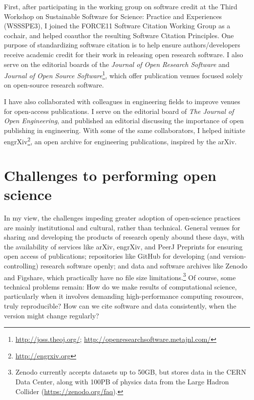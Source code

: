 \documentclass[nobib]{tufte-handout}
\begin{document}
First, after participating in the working group on software credit at the Third
Workshop on Sustainable Software for Science: Practice and Experiences
(WSSSPE3)\autocite{Katz:2016er}, I joined the FORCE11 Software Citation Working
Group as a cochair, and helped coauthor the resulting Software Citation
Principles\autocite{Smith:2016kt}. One purpose of standardizing software
citation is to help ensure authors\slash developers receive academic credit for
their work in releasing open research software. I also serve on the editorial
boards of the \textit{Journal of Open Research
Software} and \textit{Journal of Open Source Software}\footnote{\url{http://joss.theoj.org/};
\url{http://openresearchsoftware.metajnl.com/}},
which offer publication venues focused solely on open-source research software.

I have also collaborated with colleagues in engineering fields to improve
venues for open-access publications. I serve on the editorial board of
\textit{The Journal of Open Engineering},
and published an editorial discussing the importance of open publishing in
engineering\autocite{TJOE:editorial}. With some of the same collaborators, I
helped initiate engrXiv\footnote{\url{http://engrxiv.org}}, an open archive
for engineering publications, inspired by the arXiv.


\section{Challenges to performing open science}
\label{sec:challenges}

In my view, the challenges impeding greater adoption of open-science practices
are mainly institutional and cultural, rather than technical. General venues for sharing
and developing the products of research openly abound these days, with the availability
of services like arXiv, engrXiv, and PeerJ Preprints for ensuring open access of
publications; repositories like GitHub for developing (and version-controlling)
research software openly; and data and software archives like Zenodo and Figshare,
which practically have no file size limitations.\footnote{Zenodo currently accepts
datasets up to 50GB, but stores data in the CERN Data Center, along with 100PB of
physics data from the Large Hadron Collider (\url{https://zenodo.org/faq}).}
Of course, some technical problems remain: How do we make results of computational
science, particularly when it involves demanding high-performance computing resources,
truly reproducible? How can we cite software and data consistently, when
the version might change regularly?
\end{document}
